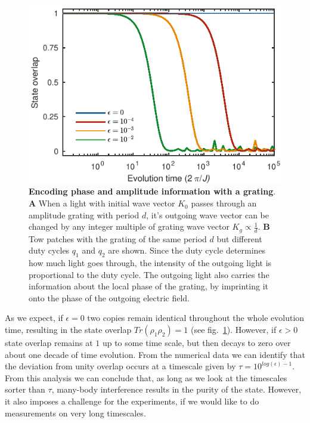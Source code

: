 \begin{figure}[t]
	\centering
	\includegraphics[scale=1]{figures/CBH_overlap.pdf}
	\caption{{\bf Encoding phase and amplitude information with a grating}. {\bf A} When a light with initial wave vector $K_0$ passes through an amplitude grating with period $d$, it's outgoing wave vector can be changed by any integer multiple of grating wave vector $K_g\propto \frac{1}{d}$. {\bf B} Tow patches with the grating of the same period $d$ but different duty cycles $q_1$ and $q_2$ are shown. Since the duty cycle determines how much light goes through, the intensity of the outgoing light is proportional to the duty cycle. The outgoing light also carries the information about the local phase of the grating, by imprinting it onto the phase of the outgoing electric field.}
	\label{fig:CBH_overlap}
\end{figure}


As we expect, if $\epsilon = 0$ two copies remain identical throughout the whole evolution time, resulting in the state overlap $Tr(\rho_1 \rho_2) = 1$ (see fig.~\ref{fig:CBH_overlap}). However, if $\epsilon > 0$ state overlap remains at $1$ up to some time scale, but then decays to zero over about one decade of time evolution. From the numerical data we can identify that the deviation from unity overlap occurs at a timescale given by $\tau = 10^{log(\epsilon)-1}$. From this analysis we can conclude that, as long as we look at the timescales sorter than $\tau$, many-body interference results in the purity of the state. However, it also imposes a challenge for the experiments, if we would like to do measurements on very long timescales.

